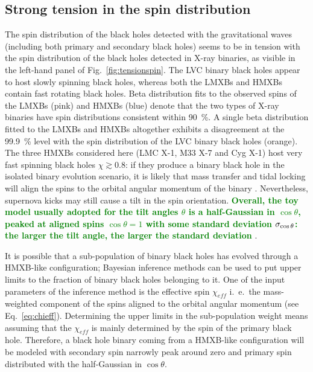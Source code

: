 \documentclass[a4paper,titlepage]{book}     	%
\newcommand{\erika}[1]{\textcolor{green}{\bf#1}}
\begin{document}
\subsection{Strong tension in the spin distribution}\label{subsec:tensionspin}
The spin distribution of the black holes detected with the gravitational waves (including both primary and secondary black holes) seems to be in tension with the spin distribution of the black holes detected in X-ray binaries, as visible in the left-hand panel of Fig.\ \ref{fig:tensionspin}. The LVC binary black holes appear to host slowly spinning black holes, whereas both the LMXBs and HMXBs contain fast rotating black holes. Beta distribution fits to the observed spins of the LMXBs (pink) and HMXBs (blue) denote that the two types of X-ray binaries have spin distributions consistent within 90~\%. A single beta distribution fitted to the LMXBs and HMXBs altogether exhibits a disagreement at the 99.9~\% level with the spin distribution of the LVC binary black holes (orange).\cite{HMXBH_spins2021}\\

The three HMXBs considered here (LMC X-1, M33 X-7 and Cyg X-1) host very fast spinning black holes $\chi \gtrsim 0.8$: if they produce a binary black hole in the isolated binary evolution scenario, it is likely that mass transfer and tidal locking will align the spins to the orbital angular momentum of the binary \cite{Kalogera2000_spinaligned}. Nevertheless, supernova kicks may still cause a tilt in the spin orientation. \erika{Overall, the toy model usually adopted for the tilt angles $\theta$ is a half-Gaussian in $\cos \theta$, peaked at aligned spins $\cos \theta = 1$  with some standard deviation $\sigma_{\rm \cos \theta}$: the larger the tilt angle, the larger the standard deviation} \cite{spintiltmodel_Talbot2017}. %

It is possible that a sub-population of binary black holes has evolved through a HMXB-like configuration; Bayesian inference methods can be used to put upper limits to the fraction of binary black holes belonging to it. One of the input parameters of the inference method is the effective spin $\chi_{eff}$ i.\ e.\ the mass-weighted component of the spins aligned to the orbital angular momentum (see Eq.\ \ref{eq:chieff}). Determining the upper limits in the sub-population weight means assuming that the $\chi_{eff}$ is mainly determined by the spin of the primary black hole. Therefore, a black hole binary coming from a HMXB-like configuration will be modeled with secondary spin narrowly peak around zero and primary spin distributed with the half-Gaussian in $\cos \theta$. 
\end{document}
